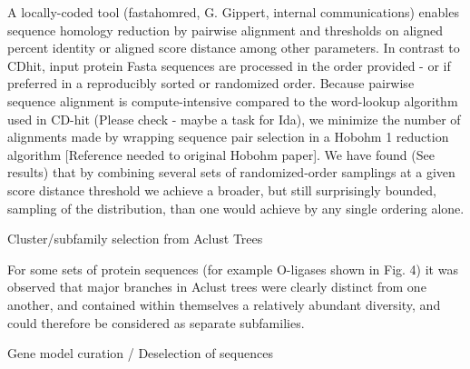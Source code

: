 \documentclass{article}
\begin{document}
A locally-coded tool (fastahomred, G. Gippert, internal communications) enables sequence homology reduction by pairwise alignment and thresholds on aligned percent identity or aligned score distance among other parameters. In contrast to CDhit, input protein Fasta sequences are processed in the order provided - or if preferred in a reproducibly sorted or randomized order.  Because pairwise sequence alignment is compute-intensive compared to the word-lookup algorithm used in CD-hit (Please check - maybe a task for Ida), we minimize the number of alignments made by wrapping sequence pair selection in a Hobohm 1 reduction algorithm [Reference needed to original Hobohm paper]. We have found (See results) that by combining several sets of randomized-order samplings at a given score distance threshold we achieve a broader, but still surprisingly bounded, sampling of the distribution, than one would achieve by any single ordering alone.

Cluster/subfamily selection from Aclust Trees

For some sets of protein sequences (for example O-ligases shown in Fig. 4) it was observed that major branches in Aclust trees were clearly distinct from one another, and contained within themselves a relatively abundant diversity, and could therefore be considered as separate subfamilies. %

Gene model curation / Deselection of sequences
\end{document}
